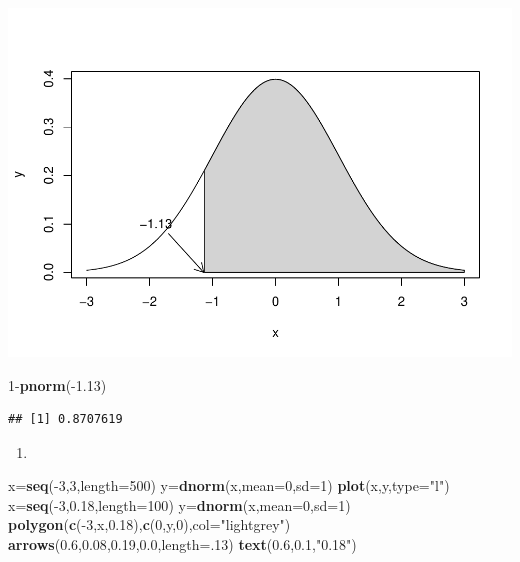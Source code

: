 \documentclass[]{article}
\newenvironment{Shaded}{\begin{snugshade}}{\end{snugshade}}
\newcommand{\KeywordTok}[1]{\textcolor[rgb]{0.13,0.29,0.53}{\textbf{{#1}}}}
\newcommand{\DataTypeTok}[1]{\textcolor[rgb]{0.13,0.29,0.53}{{#1}}}
\newcommand{\DecValTok}[1]{\textcolor[rgb]{0.00,0.00,0.81}{{#1}}}
\newcommand{\FloatTok}[1]{\textcolor[rgb]{0.00,0.00,0.81}{{#1}}}
\newcommand{\StringTok}[1]{\textcolor[rgb]{0.31,0.60,0.02}{{#1}}}
\newcommand{\NormalTok}[1]{{#1}}
\begin{document}
\includegraphics{DATA_606_-_Homework_3_files/figure-latex/unnamed-chunk-1-1.pdf}

\begin{Shaded}
\begin{Highlighting}[]
\DecValTok{1}\NormalTok{-}\KeywordTok{pnorm}\NormalTok{(-}\FloatTok{1.13}\NormalTok{)}
\end{Highlighting}
\end{Shaded}

\begin{verbatim}
## [1] 0.8707619
\end{verbatim}

\begin{enumerate}
\def\labelenumi{(\alph{enumi})}
\setcounter{enumi}{1}
\item
\end{enumerate}

\begin{Shaded}
\begin{Highlighting}[]
\NormalTok{x=}\KeywordTok{seq}\NormalTok{(-}\DecValTok{3}\NormalTok{,}\DecValTok{3}\NormalTok{,}\DataTypeTok{length=}\DecValTok{500}\NormalTok{)}
\NormalTok{y=}\KeywordTok{dnorm}\NormalTok{(x,}\DataTypeTok{mean=}\DecValTok{0}\NormalTok{,}\DataTypeTok{sd=}\DecValTok{1}\NormalTok{)}
\KeywordTok{plot}\NormalTok{(x,y,}\DataTypeTok{type=}\StringTok{"l"}\NormalTok{)}
\NormalTok{x=}\KeywordTok{seq}\NormalTok{(-}\DecValTok{3}\NormalTok{,}\FloatTok{0.18}\NormalTok{,}\DataTypeTok{length=}\DecValTok{100}\NormalTok{)}
\NormalTok{y=}\KeywordTok{dnorm}\NormalTok{(x,}\DataTypeTok{mean=}\DecValTok{0}\NormalTok{,}\DataTypeTok{sd=}\DecValTok{1}\NormalTok{)}
\KeywordTok{polygon}\NormalTok{(}\KeywordTok{c}\NormalTok{(-}\DecValTok{3}\NormalTok{,x,}\FloatTok{0.18}\NormalTok{),}\KeywordTok{c}\NormalTok{(}\DecValTok{0}\NormalTok{,y,}\DecValTok{0}\NormalTok{),}\DataTypeTok{col=}\StringTok{"lightgrey"}\NormalTok{)}
\KeywordTok{arrows}\NormalTok{(}\FloatTok{0.6}\NormalTok{,}\FloatTok{0.08}\NormalTok{,}\FloatTok{0.19}\NormalTok{,}\FloatTok{0.0}\NormalTok{,}\DataTypeTok{length=}\NormalTok{.}\DecValTok{13}\NormalTok{)}
\KeywordTok{text}\NormalTok{(}\FloatTok{0.6}\NormalTok{,}\FloatTok{0.1}\NormalTok{,}\StringTok{"0.18"}\NormalTok{)}
\end{Highlighting}
\end{Shaded}
\end{document}
